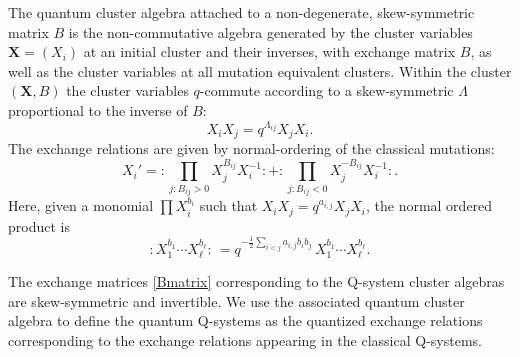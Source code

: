 \documentclass[12pt]{amsart}
\newcommand{\bX}{{\mathbf X}}
\numberwithin{equation}{section}
\numberwithin{table}{section}
\begin{document}
The quantum cluster algebra attached to a non-degenerate, skew-symmetric matrix $B$ is the non-commutative algebra generated by the cluster variables $\bX=(X_i)$ at an initial cluster and their inverses, with exchange matrix $B$, as well as
the cluster variables at all mutation equivalent clusters.
Within the cluster $(\mathbf X, B)$ the cluster variables $q$-commute according to a skew-symmetric $\Lambda$ proportional to the inverse of $B$:
$$ X_i X_j = q^{\Lambda_{ij}} X_j X_i.$$ 
The exchange relations are given by normal-ordering of the classical mutations:
$$
X_i' = : \prod_{j: B_{ij}>0} X_j^{B_{ij}} X_i^{-1}: + :\prod_{j: B_{ij}<0} X_j^{-B_{ij}} X_i^{-1}: .
$$
Here, given a monomial $\prod X_i^{b_i}$ such that $X_iX_j =q^{a_{i,j}}X_jX_i$, the normal ordered product is
$$:X_1^{b_1} \cdots X_\ell^{b_\ell} :\, = q^{-\frac{1}{2}\sum_{i<j} a_{i,j} b_i b_j}\, X_1^{b_1} \cdots X_\ell^{b_\ell}.$$

The exchange matrices \eqref{Bmatrix} corresponding to the Q-system cluster algebras are skew-symmetric and invertible. We use the associated quantum cluster algebra to define 
the quantum Q-systems as the quantized exchange relations corresponding to the exchange relations appearing in the classical Q-systems. 
\end{document}
